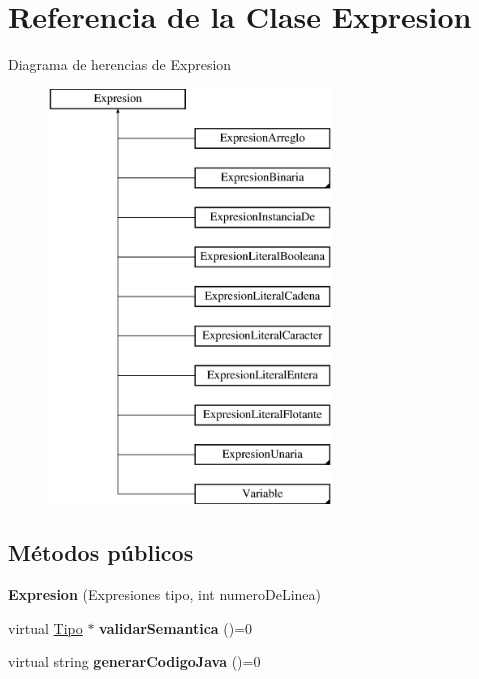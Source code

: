 \hypertarget{class_expresion}{\section{Referencia de la Clase Expresion}
\label{class_expresion}
}
Diagrama de herencias de Expresion\begin{figure}[H]
\begin{center}
\leavevmode
\includegraphics[height=11.000000cm]{class_expresion}
\end{center}
\end{figure}
\subsection*{Métodos públicos}
\begin{DoxyCompactItemize}
\item 
\hypertarget{class_expresion_a47f537b0bfb42f87df3130fe00eb417a}{{\bfseries Expresion} (Expresiones tipo, int numero\-De\-Linea)}\label{class_expresion_a47f537b0bfb42f87df3130fe00eb417a}

\item 
\hypertarget{class_expresion_ab28509da9a3eb68ae5a316484ac6f94a}{virtual \hyperlink{class_tipo}{Tipo} $\ast$ {\bfseries validar\-Semantica} ()=0}\label{class_expresion_ab28509da9a3eb68ae5a316484ac6f94a}

\item 
\hypertarget{class_expresion_afe2ed369d6f74507dfa46e4725dbb088}{virtual string {\bfseries generar\-Codigo\-Java} ()=0}\label{class_expresion_afe2ed369d6f74507dfa46e4725dbb088}

\end{DoxyCompactItemize}
